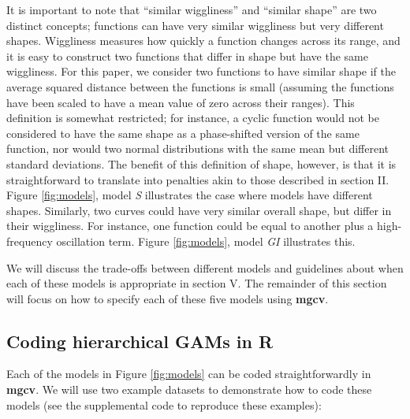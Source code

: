 \documentclass[12pt]{article}
\begin{document}
It is important to note that ``similar wiggliness'' and ``similar
shape'' are two distinct concepts; functions can have very similar
wiggliness but very different shapes. Wiggliness measures how quickly a
function changes across its range, and it is easy to construct two
functions that differ in shape but have the same wiggliness. For this
paper, we consider two functions to have similar shape if the average
squared distance between the functions is small (assuming the functions
have been scaled to have a mean value of zero across their ranges). This
definition is somewhat restricted; for instance, a cyclic function would
not be considered to have the same shape as a phase-shifted version of
the same function, nor would two normal distributions with the same mean
but different standard deviations. The benefit of this definition of
shape, however, is that it is straightforward to translate into
penalties akin to those described in section II. Figure
\ref{fig:models}, model \emph{S} illustrates the case where models have
different shapes. Similarly, two curves could have very similar overall
shape, but differ in their wiggliness. For instance, one function could
be equal to another plus a high-frequency oscillation term. Figure
\ref{fig:models}, model \emph{GI} illustrates this.

We will discuss the trade-offs between different models and guidelines
about when each of these models is appropriate in section V. The
remainder of this section will focus on how to specify each of these
five models using \textbf{mgcv}.

\subsection{Coding hierarchical GAMs in
R}\label{coding-hierarchical-gams-in-r}

Each of the models in Figure \ref{fig:models} can be coded
straightforwardly in \textbf{mgcv}. We will use two example datasets to
demonstrate how to code these models (see the supplemental code to
reproduce these examples):
\end{document}
